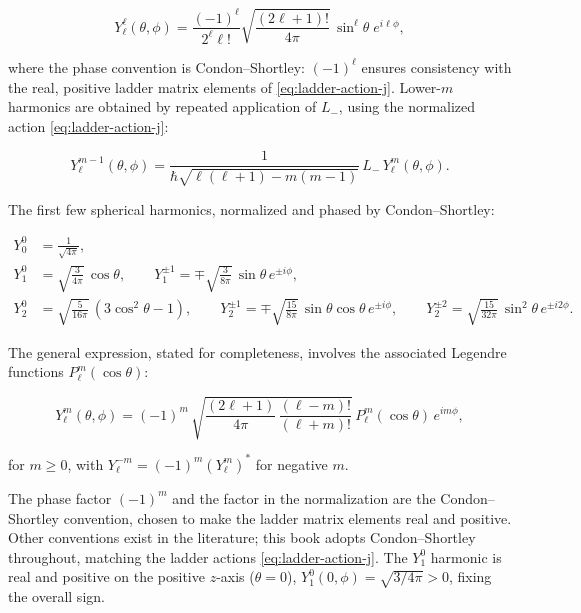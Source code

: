 \begin{linenomath}
  \begin{equation}
    Y_\ell^\ell(\theta,\phi) = \frac{(-1)^\ell}{2^\ell \ell!}
    \sqrt{\frac{(2\ell+1)!}{4\pi}}\,
    \sin^\ell\theta\;e^{i\ell\phi},
  \end{equation}
\end{linenomath}
where the phase convention is Condon--Shortley: $(-1)^\ell$ ensures consistency with the real, positive ladder matrix elements of \eqref{eq:ladder-action-j}. Lower-$m$ harmonics are obtained by repeated application of $L_-$, using the normalized action \eqref{eq:ladder-action-j}:
\begin{linenomath}
  \begin{equation}
    Y_\ell^{m-1}(\theta,\phi)
    = \frac{1}{\hbar\sqrt{\ell(\ell+1) - m(m-1)}}\,
    L_-\,Y_\ell^{m}(\theta,\phi).
  \end{equation}
\end{linenomath}
The first few spherical harmonics, normalized and phased by Condon--Shortley:
\begin{linenomath}
  \begin{align}
    Y_0^0 &= \frac{1}{\sqrt{4\pi}}, \nonumber\\
    Y_1^0 &= \sqrt{\frac{3}{4\pi}}\,\cos\theta, \qquad
    Y_1^{\pm1} = \mp\sqrt{\frac{3}{8\pi}}\,\sin\theta\,e^{\pm i\phi}, \nonumber\\
    Y_2^0 &= \sqrt{\frac{5}{16\pi}}\,(3\cos^2\theta - 1), \qquad
    Y_2^{\pm1} = \mp\sqrt{\frac{15}{8\pi}}\,\sin\theta\cos\theta\,e^{\pm i\phi}, \qquad
    Y_2^{\pm2} = \sqrt{\frac{15}{32\pi}}\,\sin^2\theta\,e^{\pm i2\phi}.
  \end{align}
\end{linenomath}
The general expression, stated for completeness, involves the associated Legendre functions $P_\ell^m(\cos\theta)$:
\begin{linenomath}
  \begin{equation}
    Y_\ell^m(\theta,\phi) = (-1)^m\,
    \sqrt{\frac{(2\ell+1)}{4\pi}\,
    \frac{(\ell-m)!}{(\ell+m)!}}\,
    P_\ell^m(\cos\theta)\,e^{im\phi},
  \end{equation}
\end{linenomath}
for $m \ge 0$, with $Y_\ell^{-m} = (-1)^m (Y_\ell^m)^*$ for negative $m$.

\begin{note}
  The phase factor $(-1)^m$ and the factor in the normalization are the Condon--Shortley convention, chosen to make the ladder matrix elements real and positive. Other conventions exist in the literature; this book adopts Condon--Shortley throughout, matching the ladder actions \eqref{eq:ladder-action-j}. The $Y_1^0$ harmonic is real and positive on the positive $z$-axis ($\theta = 0$), $Y_1^0(0,\phi) = \sqrt{3/4\pi} > 0$, fixing the overall sign.
\end{note}

